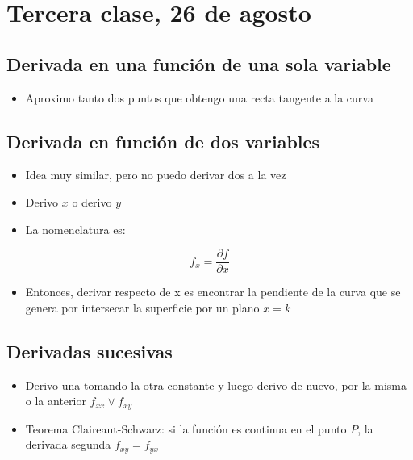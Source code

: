 \section{Tercera clase, 26 de agosto}

\subsection{Derivada en una función de una sola variable}
\begin{itemize}
    \item Aproximo tanto dos puntos que obtengo una recta tangente a la curva
\end{itemize}

\subsection{Derivada en función de dos variables}
\begin{itemize}
    \item Idea muy similar, pero no puedo derivar dos a la vez
    \item Derivo \(x\) o derivo \(y\)
    \item La nomenclatura es:
\end{itemize}

\begin{equation*}
    f_x = \frac{\partial f}{\partial x}
\end{equation*}

\begin{itemize}
    \item Entonces, derivar respecto de x es encontrar la pendiente de la
          curva que se genera por intersecar la superficie por un plano \(x = k\)
\end{itemize}

\subsection{Derivadas sucesivas}
\begin{itemize}
    \item Derivo una tomando la otra constante y luego derivo de nuevo,
          por la misma o la anterior \(f_{xx} \lor f_{xy}\)
    \item Teorema Claireaut-Schwarz: si la función es continua en el punto \(P\),
          la derivada segunda \(f_{xy} = f_{yx}\)
\end{itemize}

